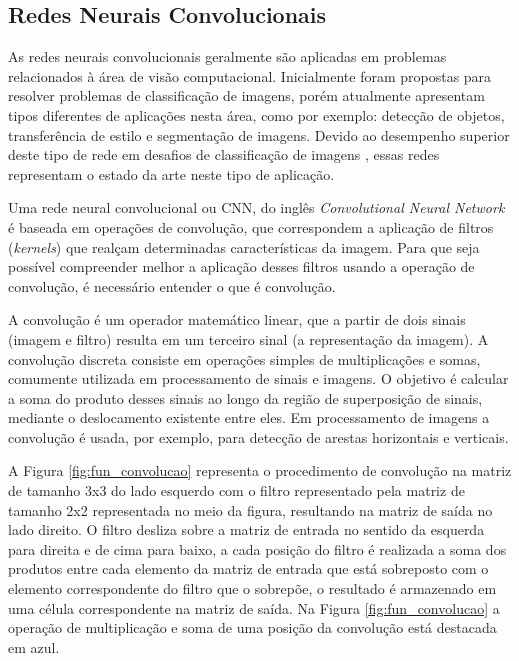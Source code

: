 \subsection{Redes Neurais Convolucionais}\label{subsec:cap_fundamentos_cnn}

As redes neurais convolucionais \cite{lecun1990handwritten} geralmente são aplicadas em problemas relacionados à área de visão computacional. Inicialmente foram propostas para resolver problemas de classificação de imagens, porém atualmente apresentam tipos diferentes de aplicações nesta área, como por exemplo: detecção de objetos, transferência de estilo e segmentação de imagens. Devido ao desempenho superior deste tipo de rede em desafios de classificação de imagens \cite{russakovsky2015imagenet}, essas redes representam o estado da arte neste tipo de aplicação. 

Uma rede neural convolucional ou CNN, do inglês \textit{Convolutional Neural Network} é baseada em operações de convolução, que correspondem a aplicação de filtros (\textit{kernels}) que realçam determinadas características da imagem. Para que seja possível compreender melhor a aplicação desses filtros usando a operação de convolução, é necessário entender o que é convolução.

A convolução é um operador matemático linear, que a partir de dois sinais (imagem e filtro) resulta em um terceiro sinal (a representação da imagem). A convolução discreta consiste em operações simples de multiplicações e somas, comumente utilizada em processamento de sinais e imagens. O objetivo é calcular a soma do produto desses sinais ao longo da região de superposição de sinais, mediante o deslocamento existente entre eles. Em processamento de imagens a convolução é usada, por exemplo, para detecção de arestas horizontais e verticais.

A Figura \ref{fig:fun_convolucao} representa o procedimento de convolução na matriz de tamanho 3x3 do lado esquerdo com o filtro representado pela matriz de tamanho 2x2 representada no meio da figura, resultando na matriz de saída no lado direito. O filtro desliza sobre a matriz de entrada no sentido da esquerda para direita e de cima para baixo, a cada posição do filtro é realizada a soma dos produtos entre cada elemento da matriz de entrada que está sobreposto com o elemento correspondente do filtro que o sobrepõe, o resultado é armazenado em uma célula correspondente na matriz de saída. Na Figura \ref{fig:fun_convolucao} a operação de multiplicação e soma de uma posição da convolução está destacada em azul.


